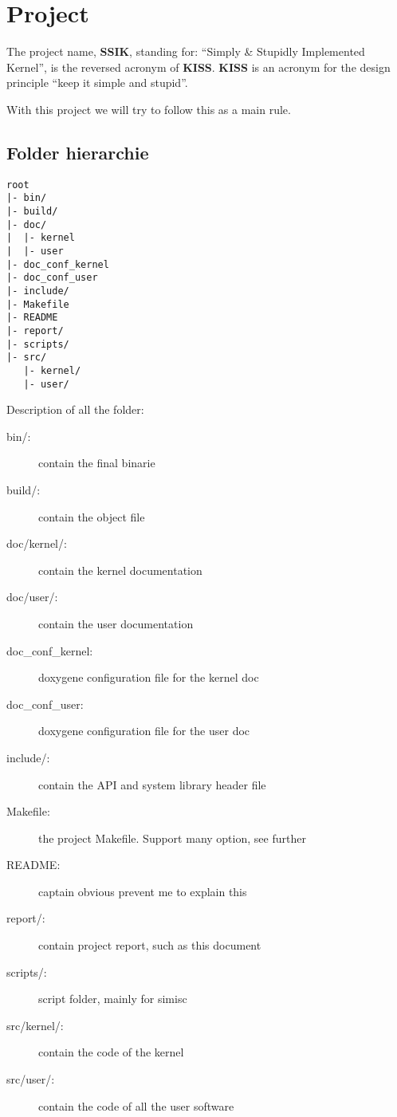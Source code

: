\chapter{Project}

The project name, \textbf{SSIK}, standing for: ``Simply \& Stupidly Implemented Kernel'', is the reversed acronym of \textbf{KISS}. \textbf{KISS} is an acronym for the design principle ``keep it simple and stupid''.

With this project we will try to follow this as a main rule.

\section{Folder hierarchie}

\begin{verbatim}
root
|- bin/
|- build/
|- doc/
|  |- kernel
|  |- user
|- doc_conf_kernel
|- doc_conf_user
|- include/
|- Makefile
|- README
|- report/
|- scripts/
|- src/
   |- kernel/
   |- user/
\end{verbatim}

Description of all the folder:
\begin{description}
  \item[bin/:] contain the final binarie
  \item[build/:] contain the object file
  \item[doc/kernel/:] contain the kernel documentation
  \item[doc/user/:] contain the user documentation
  \item[doc\_conf\_kernel:] doxygene configuration file for the kernel doc
  \item[doc\_conf\_user:] doxygene configuration file for the user doc
  \item[include/:] contain the API and system library header file
  \item[Makefile:] the project Makefile. Support many option, see further
  \item[README:] captain obvious prevent me to explain this
  \item[report/:] contain project report, such as this document
  \item[scripts/:] script folder, mainly for simisc
  \item[src/kernel/:] contain the code of the kernel
  \item[src/user/:] contain the code of all the user software
\end{description}

